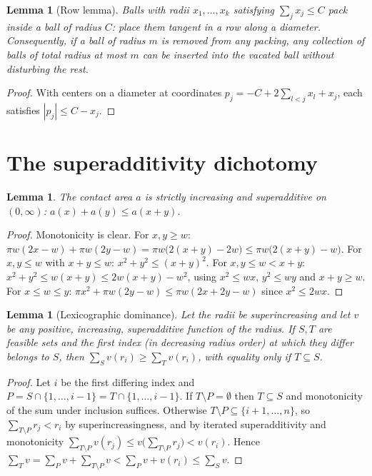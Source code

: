 \documentclass[11pt]{article}
\newtheorem{lemma}[theorem]{Lemma}
\theoremstyle{definition}
\begin{document}
\begin{lemma}[Row lemma]\label{lem:row}
Balls with radii $x_1,\dots,x_k$ satisfying $\sum_j x_j\le C$ pack
inside a ball of radius $C$: place them tangent in a row along a diameter.
Consequently, if a ball of radius $m$ is removed from any packing, any
collection of balls of total radius at most $m$ can be inserted into the
vacated ball without disturbing the rest.
\end{lemma}
\begin{proof}
With centers on a diameter at coordinates
$p_j=-C+2\sum_{l<j}x_l+x_j$, each satisfies $|p_j|\le C-x_j$.
\end{proof}

\section{The superadditivity dichotomy}\label{sec:superadd}

\begin{lemma}\label{lem:superadd}
The contact area $a$ is strictly increasing and superadditive on $(0,\infty)$:
$a(x)+a(y)\le a(x+y)$.
\end{lemma}
\begin{proof}
Monotonicity is clear. For $x,y\ge w$:
$\pi w(2x-w)+\pi w(2y-w)=\pi w\bigl(2(x{+}y)-2w\bigr)\le\pi w\bigl(2(x{+}y)-w\bigr)$.
For $x,y\le w$ with $x+y\le w$: $x^2+y^2\le(x+y)^2$.
For $x,y\le w<x+y$: $x^2+y^2\le w(x+y)\le 2w(x+y)-w^2$, using
$x^2\le wx$, $y^2\le wy$ and $x+y\ge w$.
For $x\le w\le y$: $\pi x^2+\pi w(2y-w)\le\pi w(2x+2y-w)$ since $x^2\le 2wx$.
\end{proof}

\begin{lemma}[Lexicographic dominance]\label{lem:lexdom}
Let the radii be superincreasing and let $v$ be any positive, increasing,
superadditive function of the radius. If $S,T$ are feasible sets and the first
index (in decreasing radius order) at which they differ belongs to $S$, then
$\sum_S v(r_i)\ge\sum_T v(r_i)$, with equality only if $T\subseteq S$.
\end{lemma}
\begin{proof}
Let $i$ be the first differing index and $P=S\cap\{1,\dots,i-1\}
=T\cap\{1,\dots,i-1\}$. If $T\setminus P=\emptyset$ then $T\subseteq S$ and
monotonicity of the sum under inclusion suffices. Otherwise
$T\setminus P\subseteq\{i{+}1,\dots,n\}$, so
$\sum_{T\setminus P}r_j<r_i$ by superincreasingness, and by iterated
superadditivity and monotonicity
$\sum_{T\setminus P}v(r_j)\le v\bigl(\sum_{T\setminus P}r_j\bigr)<v(r_i)$.
Hence $\sum_T v=\sum_P v+\sum_{T\setminus P}v<\sum_P v+v(r_i)\le\sum_S v$.
\end{proof}
\end{document}
